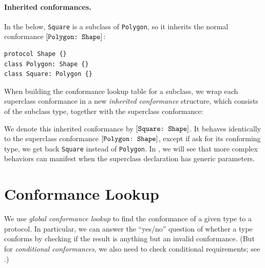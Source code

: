 \documentclass[../generics]{subfiles}
\begin{document}
\paragraph{Inherited conformances.}
In the below, \texttt{Square} is a subclass of \texttt{Polygon}, so it inherits the normal conformance $[\texttt{Polygon:~Shape}]$:
\begin{Verbatim}
protocol Shape {}
class Polygon: Shape {}
class Square: Polygon {}
\end{Verbatim}
When building the conformance lookup table for a subclass, we wrap each superclass conformance in a new \emph{inherited conformance} structure, which consists of the subclass type, together with the superclass conformance:
\begin{center}
\end{center}
We denote this inherited conformance by $[\texttt{Square:~Shape}]$. It behaves identically to the superclass conformance $[\texttt{Polygon:~Shape}]$, except if ask for its conforming type, we get back \texttt{Square} instead of \texttt{Polygon}. In , we will see that more complex behaviors can manifest when the superclass declaration has generic parameters.

\section{Conformance Lookup}\label{conformance lookup}

We use \emph{global conformance lookup} to find the conformance of a given type to a protocol. In particular, we can answer the ``yes/no'' question of whether a type conforms by checking if the result is anything but an invalid conformance. (But for \emph{conditional conformances}, we also need to check conditional requirements; see .)
\end{document}
